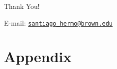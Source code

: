\documentclass[aspectratio=169, t]{beamer}
\begin{document}
\begin{frame}[c]
    \Large Thank You!

    \vspace{3mm}
    \normalsize E-mail: \texttt{\url{santiago_hermo@brown.edu}}
\end{frame}


\appendix

\renewcommand\thetable{\thesection.\arabic{table}}
\renewcommand\thefigure{\thesection.\arabic{figure}} 
\setcounter{table}{0}
\setcounter{figure}{0}

\section{Appendix}
\end{document}
